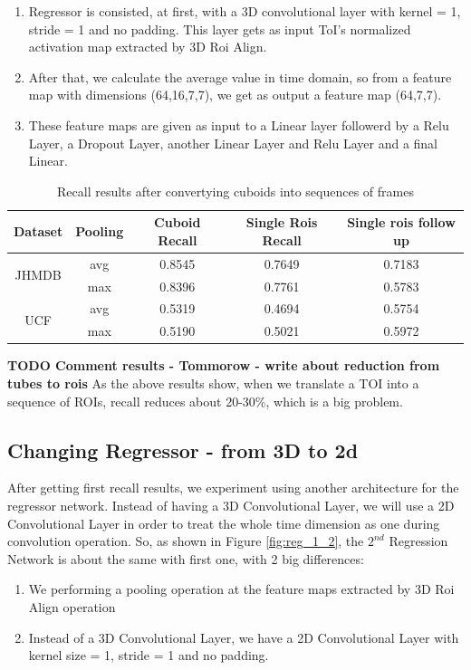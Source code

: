 \begin{enumerate}
\item Regressor is consisted, at first, with a 3D convolutional layer with kernel = 1, stride = 1 and no padding. This layer gets as input ToI's normalized activation map extracted by 3D Roi Align.
\item After that, we calculate the average value in time domain, so from a feature map with dimensions (64,16,7,7), we get as output a feature map (64,7,7).
\item These feature maps are given as input to a Linear layer followerd by a Relu Layer, a Dropout Layer, another Linear Layer and Relu Layer and a final Linear.
\end{enumerate}

\begin{table}[h]
  \centering
  \begin{tabular} {||c | c || c  c  c ||}
    \hline
    \textbf{Dataset} & \textbf{Pooling} & Cuboid Recall & Single Rois Recall & Single rois follow up\\
    \hline                
    \multirow{2}{*}{JHMDB} & avg & 0.8545 & 0.7649 & 0.7183 \\
    \cline{2-5}
    {} & max & 0.8396 & 0.7761 & 0.5783 \\
    \cline{1-5}
    \multirow{2}{*}{UCF} & avg & 0.5319 & 0.4694 & 0.5754 \\
    \cline{2-5}
    {} & max & 0.5190 & 0.5021 & 0.5972 \\
    \cline{1-5}
                                   
  \end{tabular}
  \caption{Recall results after convertying cuboids into sequences of frames}
  \label{table:reg_1_1}
\end{table}

\textbf{TODO Comment results - Tommorow - write about reduction from tubes to rois}
As the above results show, when we translate a TOI into a sequence of ROIs, recall reduces about 20-30\%, which is a big problem. 

\subsection{Changing Regressor - from 3D to 2d}
After getting first recall results, we experiment using another architecture for the regressor network. Instead of having a 3D Convolutional
Layer, we will use a 2D Convolutional Layer in order to treat the whole time dimension as one during convolution operation. So, as shown in Figure \ref{fig:reg_1_2},
the $2^{nd}$ Regression Network is about the same with first one, with 2 big differences:
\begin{enumerate}
\item We performing a pooling operation at the feature maps extracted by 3D Roi Align operation
\item Instead of a 3D Convolutional Layer, we have a 2D Convolutional Layer with kernel size = 1, stride = 1 and no padding.
\end{enumerate}


